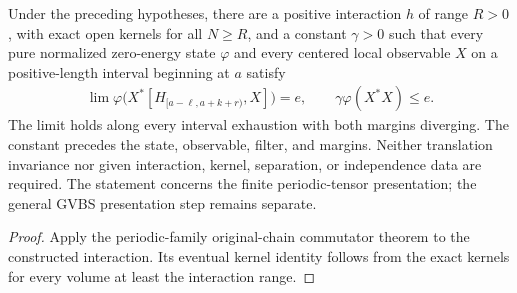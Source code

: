 \begin{lemma}
    \label{thm:periodic_family_constructed_commutator_gap}
    \leanok
    Under the preceding hypotheses, there are a positive interaction $h$ of range $R>0$, with exact open kernels for all $N\ge R$,
    and a constant $\gamma>0$ such that every pure normalized zero-energy
    state $\varphi$ and every centered local observable $X$ on a
    positive-length interval beginning at $a$ satisfy
    \begin{align}
        \lim \varphi\bigl(X^*[H_{[a-\ell,a+k+r)},X]\bigr)=e,
        \qquad \gamma\varphi(X^*X)\le e.
    \end{align}
    The limit holds along every interval exhaustion with both margins
    diverging. The constant precedes the state, observable, filter, and
    margins. Neither translation invariance nor given interaction,
    kernel, separation, or independence data are required.
    The statement concerns the finite periodic-tensor presentation;
    the general GVBS presentation step remains separate.
\end{lemma}
\begin{proof}\leanok
    Apply the periodic-family original-chain commutator theorem to the
    constructed interaction. Its eventual kernel identity follows from
    the exact kernels for every volume at least the interaction range.
\end{proof}

